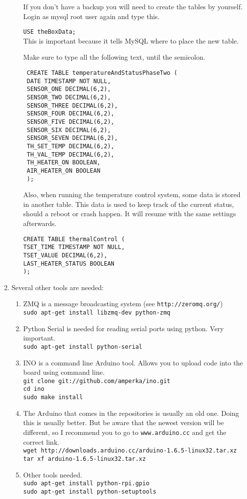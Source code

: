 \begin{enumerate}
\begin{enumerate}
If you don't have a backup you will need to create the tables by yourself. Login as mysql root user again and type this.

\verb=USE theBoxData;=\\
This is important because it tells MySQL where to place the new table.

Make sure to type all the following text, until the semicolon.
\begin{verbatim}
 CREATE TABLE temperatureAndStatusPhaseTwo ( 
 DATE TIMESTAMP NOT NULL, 
 SENSOR_ONE DECIMAL(6,2), 
 SENSOR_TWO DECIMAL(6,2), 
 SENSOR_THREE DECIMAL(6,2), 
 SENSOR_FOUR DECIMAL(6,2), 
 SENSOR_FIVE DECIMAL(6,2), 
 SENSOR_SIX DECIMAL(6,2), 
 SENSOR_SEVEN DECIMAL(6,2), 
 TH_SET_TEMP DECIMAL(6,2), 
 TH_VAL_TEMP DECIMAL(6,2), 
 TH_HEATER_ON BOOLEAN, 
 AIR_HEATER_ON BOOLEAN
 );
\end{verbatim}


Also, when running the temperature control system, some data is stored in another table. This data is used to keep track of the current
status, should a reboot or crash happen. It will resume with the same settings afterwards.

\begin{verbatim}
CREATE TABLE thermalControl (
TSET_TIME TIMESTAMP NOT NULL, 
TSET_VALUE DECIMAL(6,2), 
LAST_HEATER_STATUS BOOLEAN
);
\end{verbatim}   
\end{enumerate}

\item Several other tools are needed:
\begin{enumerate}
 \item ZMQ is a message broadcasting system (see \verb=http://zeromq.org/=)\\
\verb=sudo apt-get install libzmq-dev python-zmq=
 \item Python Serial is needed for reading serial ports using python. Very important.\\
\verb=sudo apt-get install python-serial=
\item INO is a command line Arduino tool. Allows you to upload code into the board using command line.\\
\verb=git clone git://github.com/amperka/ino.git=\\
\verb=cd ino=\\
\verb=sudo make install=
\item The Arduino that comes in the repositories is usually an old one. Doing this is usually better. But be aware that the newest version will
be different, so I recommend you to go to \verb=www.arduino.cc= and get the correct link.\\
\verb=wget http://downloads.arduino.cc/arduino-1.6.5-linux32.tar.xz=\\
\verb=tar xf arduino-1.6.5-linux32.tar.xz=
\item Other tools needed.\\
\verb=sudo apt-get install python-rpi.gpio=\\
\verb=sudo apt-get install python-setuptools=
\end{enumerate}


\end{enumerate}
